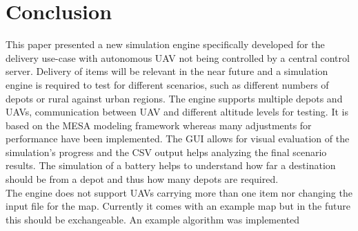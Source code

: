 \section{Conclusion}
This paper presented a new simulation engine specifically developed for the delivery use-case with autonomous UAV not being controlled by a central control server. Delivery of items will be relevant in the near future and a simulation engine is required to test for different scenarios, such as different numbers of depots or rural against urban regions. The engine supports multiple depots and UAVs, communication between UAV and different altitude levels for testing. It is based on the MESA modeling framework whereas many adjustments for performance have been implemented. The GUI allows for visual evaluation of the simulation's progress and the CSV output helps analyzing the final scenario results. The simulation of a battery helps to understand how far a destination should be from a depot and thus how many depots are required. \\
The engine does not support UAVs carrying more than one item nor changing the input file for the map. Currently it comes with an example map but in the future this should be exchangeable. An example algorithm was implemented



